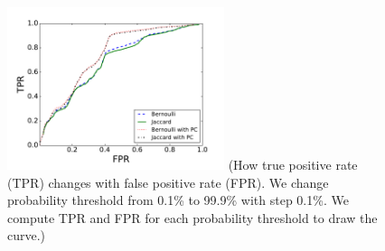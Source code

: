 \begin{figure}[t!]
\begin{center}
\includegraphics[width=2.5in]{figure/predict}
{\footnotesize{(How true positive rate (TPR) changes with false positive rate (FPR). 
We change probability threshold from 0.1\% to 99.9\% with step 0.1\%. 
We compute TPR and FPR for each probability threshold to draw the curve.)}}
\end{center}
\end{figure}
